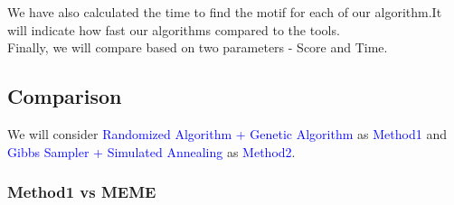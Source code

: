 \documentclass{article}
\begin{document}
\begin{Large}
We have also calculated the time to find the motif for each of our algorithm.It will indicate how fast our algorithms compared to the tools.\\

Finally, we will compare based on two parameters - Score and Time.

\subsection{Comparison}
We will consider \textcolor{blue}{Randomized Algorithm + Genetic Algorithm} as \textcolor{blue}{Method1} and \textcolor{blue}{Gibbs Sampler + Simulated Annealing} as \textcolor{blue}{Method2}.
\newpage
\subsubsection{Method1 vs MEME}


\end{Large}
\end{document}
